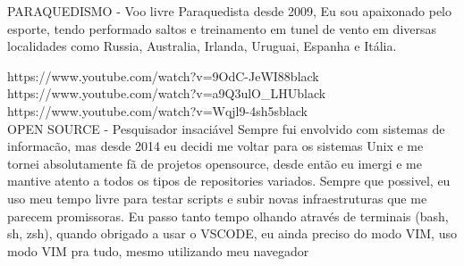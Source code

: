 \newpage
{}

\cvmetaevent
{PARAQUEDISMO - Voo livre}
{}
{}
{Paraquedista desde 2009, Eu sou apaixonado pelo esporte, tendo performado saltos e treinamento em tunel de vento em diversas localidades como Russia, Australia, Irlanda, Uruguai, Espanha e Itália.}

{https://www.youtube.com/watch?v=9OdC-JeWI88}{black}\\[6pt]
{https://www.youtube.com/watch?v=a9Q3ulO_LHU}{black}\\[6pt]
{https://www.youtube.com/watch?v=Wqjl9-4sh5s}{black}\\[6pt]

\cvmetaevent
{OPEN SOURCE - Pesquisador insaciável}
{}
{}
{ Sempre fui envolvido com sistemas de informacão, mas desde 2014 eu decidi me voltar para os sistemas Unix e me tornei absolutamente fã de projetos opensource, desde então eu imergi e me mantive atento a todos os tipos de repositories variados. Sempre que possivel, eu uso meu tempo livre para testar scripts e subir novas infraestruturas que me parecem promissoras. Eu passo tanto tempo olhando através de terminais (bash, sh, zsh), quando obrigado a usar o VSCODE, eu ainda preciso do modo VIM, uso modo VIM pra tudo, mesmo utilizando meu navegador }

\vfill
